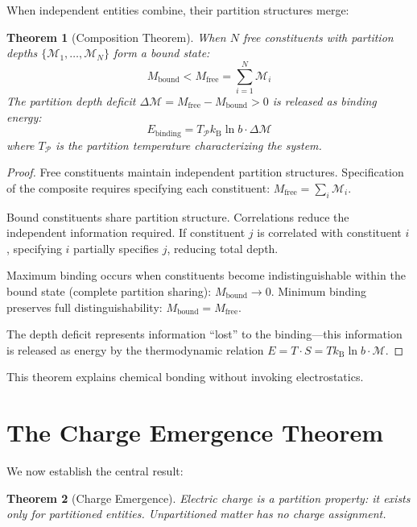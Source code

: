\documentclass[twocolumn,10pt,a4paper]{article}
\newtheorem{theorem}{Theorem}[section]
\theoremstyle{definition}
\theoremstyle{remark}
\newcommand{\kB}{k_{\mathrm{B}}}
\newcommand{\Depth}{\mathcal{M}}
\newcommand{\Partition}{\mathcal{P}}
\newcommand{\Mfree}{M_{\mathrm{free}}}
\newcommand{\Mbound}{M_{\mathrm{bound}}}
\begin{document}
When independent entities combine, their partition structures merge:

\begin{theorem}[Composition Theorem]
\label{thm:composition}
When $N$ free constituents with partition depths $\{\Depth_1, \ldots, \Depth_N\}$ form a bound state:
\begin{equation}
    \Mbound < \Mfree = \sum_{i=1}^{N} \Depth_i
\end{equation}
The partition depth deficit $\Delta\Depth = \Mfree - \Mbound > 0$ is released as binding energy:
\begin{equation}
    E_{\text{binding}} = T_{\Partition} \kB \ln b \cdot \Delta\Depth
\end{equation}
where $T_{\Partition}$ is the partition temperature characterizing the system.
\end{theorem}

\begin{proof}
Free constituents maintain independent partition structures. Specification of the composite requires specifying each constituent: $\Mfree = \sum_i \Depth_i$.

Bound constituents share partition structure. Correlations reduce the independent information required. If constituent $j$ is correlated with constituent $i$, specifying $i$ partially specifies $j$, reducing total depth.

Maximum binding occurs when constituents become indistinguishable within the bound state (complete partition sharing): $\Mbound \to 0$. Minimum binding preserves full distinguishability: $\Mbound = \Mfree$.

The depth deficit represents information ``lost'' to the binding---this information is released as energy by the thermodynamic relation $E = T \cdot S = T \kB \ln b \cdot \Depth$.
\end{proof}

This theorem explains chemical bonding without invoking electrostatics.

\section{The Charge Emergence Theorem}
\label{sec:charge}

We now establish the central result:

\begin{theorem}[Charge Emergence]
\label{thm:charge}
Electric charge is a partition property: it exists only for partitioned entities. Unpartitioned matter has no charge assignment.
\end{theorem}
\end{document}
